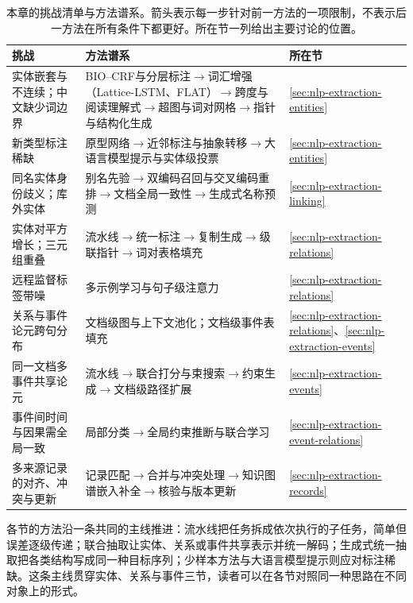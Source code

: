 \begin{table}[htbp]
  \centering
  \small
  \begin{tabularx}{\linewidth}{@{}>{\raggedright\arraybackslash}p{40mm}>{\raggedright\arraybackslash}X>{\raggedright\arraybackslash}p{14mm}@{}}
    \toprule
    挑战 & 方法谱系 & 所在节\\
    \midrule
    实体嵌套与不连续；中文缺少词边界 & BIO--CRF与分层标注$\to$词汇增强（Lattice-LSTM、FLAT）$\to$跨度与阅读理解式$\to$超图与词对网格$\to$指针与结构化生成 & \ref{sec:nlp-extraction-entities}\\
    新类型标注稀缺 & 原型网络$\to$近邻标注与抽象转移$\to$大语言模型提示与实体级投票 & \ref{sec:nlp-extraction-entities}\\
    同名实体身份歧义；库外实体 & 别名先验$\to$双编码召回与交叉编码重排$\to$文档全局一致性$\to$生成式名称预测 & \ref{sec:nlp-extraction-linking}\\
    实体对平方增长；三元组重叠 & 流水线$\to$统一标注$\to$复制生成$\to$级联指针$\to$词对表格填充 & \ref{sec:nlp-extraction-relations}\\
    远程监督标签带噪 & 多示例学习与句子级注意力 & \ref{sec:nlp-extraction-relations}\\
    关系与事件论元跨句分布 & 文档级图与上下文池化；文档级事件表填充 & \ref{sec:nlp-extraction-relations}、\ref{sec:nlp-extraction-events}\\
    同一文档多事件共享论元 & 流水线$\to$联合打分与束搜索$\to$约束生成$\to$文档级路径扩展 & \ref{sec:nlp-extraction-events}\\
    事件间时间与因果需全局一致 & 局部分类$\to$全局约束推断与联合学习 & \ref{sec:nlp-extraction-event-relations}\\
    多来源记录的对齐、冲突与更新 & 记录匹配$\to$合并与冲突处理$\to$知识图谱嵌入补全$\to$核验与版本更新 & \ref{sec:nlp-extraction-records}\\
    \bottomrule
  \end{tabularx}
  \caption{本章的挑战清单与方法谱系。箭头表示每一步针对前一方法的一项限制，不表示后一方法在所有条件下都更好。所在节一列给出主要讨论的位置。}
  \label{tab:nlp-extraction-challenges}
\end{table}

各节的方法沿一条共同的主线推进：流水线把任务拆成依次执行的子任务，简单但误差逐级传递；联合抽取让实体、关系或事件共享表示并统一解码；生成式统一抽取把各类结构写成同一种目标序列；少样本方法与大语言模型提示则应对标注稀缺。这条主线贯穿实体、关系与事件三节，读者可以在各节对照同一种思路在不同对象上的形式。

